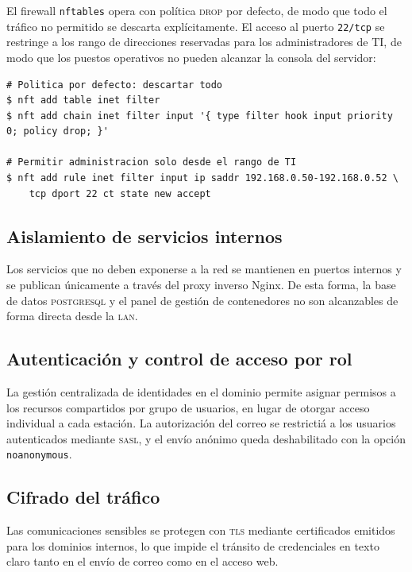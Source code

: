 El firewall \texttt{nftables} opera con pol\'itica \textsc{drop} por
defecto, de modo que todo el tr\'afico no permitido se descarta
expl\'icitamente. El acceso al puerto \texttt{22/tcp} se restringe a los
rango de direcciones reservadas para los administradores de TI, de modo
que los puestos operativos no pueden alcanzar la consola del servidor:

\begin{lstlisting}[style=terminal]
# Politica por defecto: descartar todo
$ nft add table inet filter
$ nft add chain inet filter input '{ type filter hook input priority 0; policy drop; }'

# Permitir administracion solo desde el rango de TI
$ nft add rule inet filter input ip saddr 192.168.0.50-192.168.0.52 \
    tcp dport 22 ct state new accept
\end{lstlisting}

\subsection{Aislamiento de servicios internos}

Los servicios que no deben exponerse a la red se mantienen en puertos
internos y se publican \'unicamente a trav\'es del proxy inverso Nginx. De
esta forma, la base de datos \textsc{postgresql} y el panel de gesti\'on de
contenedores no son alcanzables de forma directa desde la \textsc{lan}.

\subsection{Autenticaci\'on y control de acceso por rol}

La gesti\'on centralizada de identidades en el dominio permite asignar
permisos a los recursos compartidos por grupo de usuarios, en lugar de
otorgar acceso individual a cada estaci\'on. La autorizaci\'on del correo
se restricti\'a a los usuarios autenticados mediante \textsc{sasl}, y el
env\'io an\'onimo queda deshabilitado con la opci\'on
\texttt{noanonymous}.

\subsection{Cifrado del tr\'afico}

Las comunicaciones sensibles se protegen con \textsc{tls} mediante
certificados emitidos para los dominios internos, lo que impide el
tr\'ansito de credenciales en texto claro tanto en el env\'io de correo
como en el acceso web.


